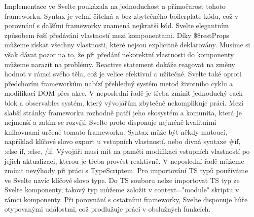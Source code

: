 Implementace ve Svelte poukázala na jednoduchost a přímočarost tohoto frameworku. 
Syntax je velmi čitelná a bez zbytečného boilerplate kódu, což v porovnání s dalšími frameworky znamená nejkratší kód. 
Svelte elegantním způsobem řeší předávání vlastností mezi komponentami. 
Díky \$\$restProps můžeme získat všechny vlastnosti, které nejsou explicitně deklarovány. 
Musíme si však dávat pozor na to, že při předání nekorektní vlastnosti do komponenty můžeme narazit na problémy. 
Reactive statement dokáže reagovat na změny hodnot v rámci svého těla, což je velice efektivní a užitečné. 
Svelte také oproti předchozím frameworkům nabízí přehledný systém metod životního cyklu a modifikaci DOM přes akce. 
V neposlední řadě je třeba zmínit jednoduchý each blok a observables systém, který vývojářům zbytečně nekomplikuje práci.
Mezi slabší stránky frameworku rozhodně patří jeho ekosystém a komunita, která je nejmenší a zatím se rozvíjí. 
Svelte proto disponuje nejméně kvalitními knihovnami určené tomuto frameworku. 
Syntax může být někdy matoucí, například klíčové slovo export u vstupních vlastností, nebo divná syntaxe \#if, :else if, :else, /if. 
Vývojáři musí mít na paměti modifikaci vstupních vlastností po jejich aktualizaci, kterou je třeba provést reaktivně. 
V neposlední řadě můžeme zmínit nevýhody při práci s TypeScriptem. Pro importování TS typů používáme ve Svelte navíc klíčové slovo type. 
Do TS souboru nelze importovat TS typ ze Svelte komponenty, takový typ můžeme založit v context="module" skriptu v rámci komponenty.
Při porovnání s ostatními frameworky, Svelte disponuje hůře otypovanými událostmi, což prodlužuje práci v obslužných funkcích.

